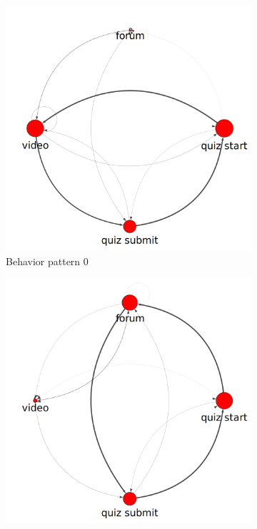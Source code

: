 \begin{figure}
  \centering
  \begin{subfigure}[t]{0.30\textwidth}
    \includegraphics[width=\textwidth]{figures/example/state0.png}
    \caption{Behavior pattern 0\label{fig:motivating-example-0}}
  \end{subfigure}
  \begin{subfigure}[t]{0.30\textwidth}
    \includegraphics[width=\textwidth]{figures/example/state1.png}

\end{subfigure}
\end{figure}
